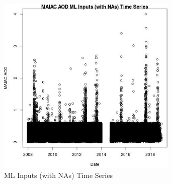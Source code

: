 \begin{figure} 
\centering  
\includegraphics[width=0.77\textwidth]{Code_Outputs/Report_ML_input_PM25_Step4_part_e_de_duplicated_aves2008-18_noNAMwNAs_MAIAC_AODvDate.jpg} 
\caption{\label{fig:Report_ML_input_PM25_Step4_part_e_de_duplicated_aves2008-18_noNAMwNAsMAIAC_AODvDate}ML Inputs (with NAs) Time Series} 
\end{figure} 
 
